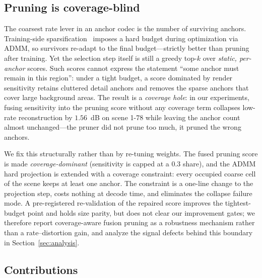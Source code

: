 \documentclass[conference]{IEEEtran}
\begin{document}
\subsection{Pruning is coverage-blind}

The coarsest rate lever in an anchor codec is the number of surviving anchors.
Training-side sparsification~\cite{zhang2025gaussianspa} imposes a hard budget
during optimization via ADMM, so survivors re-adapt to the final budget---strictly
better than pruning after training. Yet the selection step itself is still a greedy
top-$k$ over \emph{static, per-anchor} scores. Such scores cannot express the
statement ``some anchor must remain in this region'': under a tight budget, a score
dominated by render sensitivity retains cluttered detail anchors and removes the
sparse anchors that cover large background areas. The result is a \emph{coverage
hole}: in our experiments, fusing sensitivity into the pruning score without any
coverage term collapses low-rate reconstruction by $1.56$~dB on scene 1-78 while
leaving the anchor count almost unchanged---the pruner did not prune too much, it
pruned the wrong anchors.

We fix this structurally rather than by re-tuning weights. The fused pruning score
is made \emph{coverage-dominant} (sensitivity is capped at a $0.3$ share), and the
ADMM hard projection is extended with a coverage constraint: every occupied coarse
cell of the scene keeps at least one anchor. The constraint is a one-line change to
the projection step, costs nothing at decode time, and eliminates the collapse
failure mode. A pre-registered re-validation of the repaired score improves the
tightest-budget point and holds size parity, but does not clear our improvement
gates; we therefore report coverage-aware fusion pruning as a robustness
mechanism rather than a rate--distortion gain, and analyze the signal defects
behind this boundary in Section~\ref{sec:analysis}.

\subsection{Contributions}
\end{document}
